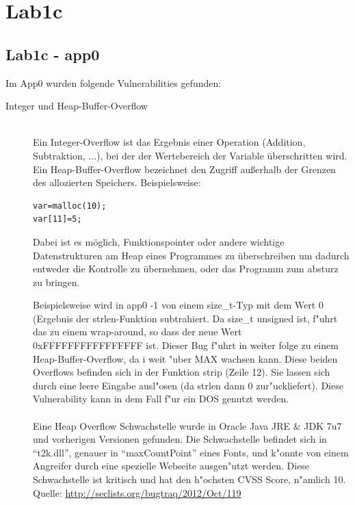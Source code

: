 \documentclass[12pt,a4paper,titlepage,oneside]{scrartcl}
\begin{document}
\section{Lab1c} 
\subsection{Lab1c - app0}
Im App0 wurden folgende Vulnerabilities gefunden:
\begin{description}
  \item[Integer und Heap-Buffer-Overflow] \hfill \\
  	 Ein Integer-Overflow ist das Ergebnis einer Operation (Addition, Subtraktion, ...), bei der der Wertebereich der Variable überschritten wird.\newline
  	 Ein Heap-Buffer-Overflow bezeichnet den Zugriff außerhalb der Grenzen des allozierten Speichers. Beispielsweise:
  	 \begin{lstlisting}
var=malloc(10);
var[11]=5;
	\end{lstlisting}
	Dabei ist es möglich, Funktionspointer oder andere wichtige Datenstrukturen am Heap eines Programmes zu überschreiben um dadurch entweder die Kontrolle zu übernehmen, oder das Programm zum absturz zu bringen.
	
	
  	 Beispielsweise wird in app0 -1 von einem size\_t-Typ mit dem Wert 0 (Ergebnis der strlen-Funktion subtrahiert. Da size\_t unsigned ist, f"uhrt das zu einem wrap-around, so dass der neue Wert 0xFFFFFFFFFFFFFFFF ist. \newline
    Dieser Bug f"uhrt in weiter folge zu einem Heap-Buffer-Overflow, da i weit "uber MAX wachsen kann.\newline
    Diese beiden Overflows befinden sich in der Funktion strip (Zeile 12). Sie lassen sich durch eine leere Eingabe ausl"osen (da strlen dann 0 zur"uckliefert).
    Diese Vulnerability kann in dem Fall f"ur ein DOS genutzt werden.\\
    \\
    Eine Heap Overflow Schwachstelle wurde in Oracle Java JRE \& JDK 7u7 und vorherigen Versionen gefunden. Die Schwachstelle befindet sich in ``t2k.dll'', genauer in ``maxCountPoint'' eines Fonts, und k"onnte von einem Angreifer durch eine spezielle Webseite ausgen"utzt werden. Diese Schwachstelle ist kritisch und hat den h"ochsten CVSS Score, n"amlich 10.\newline
    Quelle: \url{http://seclists.org/bugtraq/2012/Oct/119}
    

\end{description}
\end{document}

